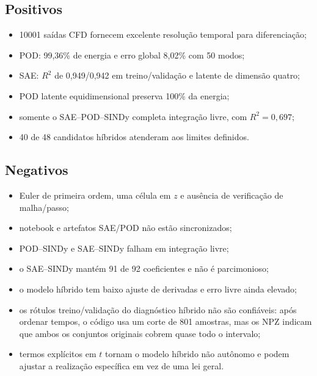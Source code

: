 \documentclass[12pt,a4paper]{article}
\begin{document}
\subsection*{Positivos}
\begin{itemize}
\item 10001 saídas CFD fornecem excelente resolução temporal para diferenciação;
\item POD: 99,36\% de energia e erro global 8,02\% com 50 modos;
\item SAE: $R^2$ de 0,949/0,942 em treino/validação e latente de dimensão quatro;
\item POD latente equidimensional preserva 100\% da energia;
\item somente o SAE--POD--SINDy completa integração livre, com $R^2=0,697$;
\item 40 de 48 candidatos híbridos atenderam aos limites definidos.
\end{itemize}
\subsection*{Negativos}
\begin{itemize}
\item Euler de primeira ordem, uma célula em $z$ e ausência de verificação de malha/passo;
\item notebook e artefatos SAE/POD não estão sincronizados;
\item POD--SINDy e SAE--SINDy falham em integração livre;
\item o SAE--SINDy mantém 91 de 92 coeficientes e não é parcimonioso;
\item o modelo híbrido tem baixo ajuste de derivadas e erro livre ainda elevado;
\item os rótulos treino/validação do diagnóstico híbrido não são confiáveis: após ordenar tempos, o código usa um corte de 801 amostras, mas os NPZ indicam que ambos os conjuntos originais cobrem quase todo o intervalo;
\item termos explícitos em $t$ tornam o modelo híbrido não autônomo e podem ajustar a realização específica em vez de uma lei geral.
\end{itemize}
\end{document}
